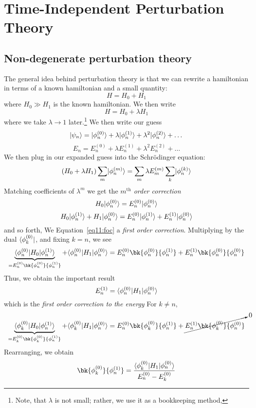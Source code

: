 \chapter{Time-Independent Perturbation Theory}
\section{Non-degenerate perturbation theory}
The general idea behind perturbation theory is that we can rewrite a hamiltonian in terms of a known hamiltonian and a small quantity:
\[H = H_0+H_1\]
where \(H_0\gg H_1\) is the known hamiltonian. We then write
\[H = H_0+\lambda H_1\]
where  we take \(\lambda\to 1\) later.\footnote{Note, that \(\lambda\) is not small; rather, we use it as a bookkeeping method,} We then write our guess
\[\lvert\psi_n\rangle = \lvert\phi^{(0)}_n\rangle+\lambda \lvert\phi_n^{(1)}\rangle + \lambda^2\lvert\phi_n^{(2)}\rangle+\dots\]
\[E_n = E_n^{(0)} + \lambda E_n^{(1)} + \lambda^2 E_n^{(2)}+\dots\]
We then plug in our expanded guess into the Schr\"odinger equation:
\[(H_0+\lambda H_1)\sum_{m}\lvert\phi_n^{(m)}\rangle = \sum_m\lambda E_m^{(m)}\sum_{k}\lvert\phi_n^{(k)}\rangle\]
Matching coefficients of \(\lambda^m\) we get the \emph{\(m^{\text{th}}\) order correction}
\[H_0 \lvert\phi^{(0)}_n\rangle = E_n^{(0)}\lvert\phi_n^{(0)}\rangle\]
\begin{equation}
	H_0\lvert\phi^{(1)}_n\rangle + H_1\lvert\phi_n^{(0)}\rangle = E_n^{(0)}\lvert\phi^{(1)}_n\rangle + E_n^{(1)}\lvert\phi_n^{(0)}\rangle\label{eq11:foc}
\end{equation}
and so forth, We Equation~\ref{eq11:foc}  a \emph{first order correction}. Multiplying by the dual \(\langle\phi^{(0)}_k\rvert\), and fixing \(k=n\), we see
\[\underbrace{\b{\f_n^{(0)}}H_0\k{\f_n^{(1)}}}_{=E_n^{(0)}\bk{\f_n^{(0)}}{\f_n^{(1)}}} + \b{\f_n^{(0)}}H_1\k{\f_n^{(0)}} = E_n^{(0)}\bk{\f_n^{(0)}}{\f_n^{(1)}} +E_n^{(1)}\bk{\f_n^{(0)}}{\f_n^{(0)}}\]
Thus, we obtain the important result
\begin{equation}
	E_n^{(1)} = \langle\phi_n^{(0)}\rvert H_1\lvert\phi_n^{(0)}\rangle
\end{equation}
which is the \emph{first order correction to the energy}
For \(k\neq n\), 
\begin{equation}
	\underbrace{\b{\f_k^{(0)}}H_0\k{\f_n^{(1)}}}_{=E_k^{(0)}\bk{\f_k^{(0)}}{\f_n^{(1)}}} + \b{\f_k^{(0)}}H_1\k{\f_n^{(0)}} = E_n^{(0)}\bk{\f_k^{(0)}}{\f_n^{(1)}} +\cancelto{0}{E_n^{(1)}\bk{\f_k^{(0)}}{\f_n^{(0)}}}\label{eq11:focw}
\end{equation}
Rearranging, we obtain
\begin{equation}
	\bk{\f_k^{(0)}}{\f_n^{(1)}} = \frac{\b{\f_k^{(0)}}H_1\k{\f_n^{(0)}}}{E_n^{(0)}-E_k^{(0)}}
\end{equation}
